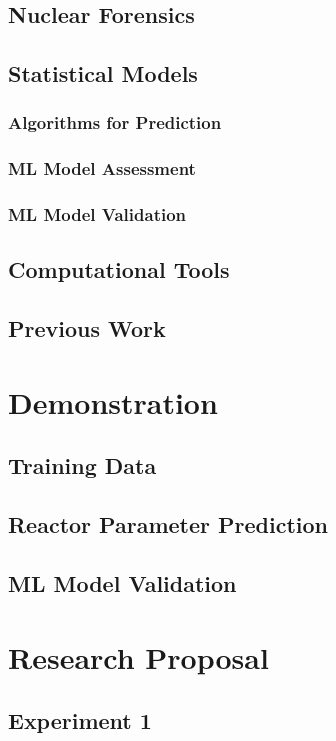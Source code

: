 \documentclass[10pt]{beamer}
\begin{document}
\subsection{Nuclear Forensics}

\subsection{Statistical Models}

\subsubsection{Algorithms for Prediction}

\subsubsection{ML Model Assessment}

\subsubsection{ML Model Validation}

\subsection{Computational Tools}

\subsection{Previous Work}


\section{Demonstration}

\subsection{Training Data}

\subsection{Reactor Parameter Prediction}

\subsection{ML Model Validation}


\section{Research Proposal}

\subsection{Experiment 1}

\end{document}
